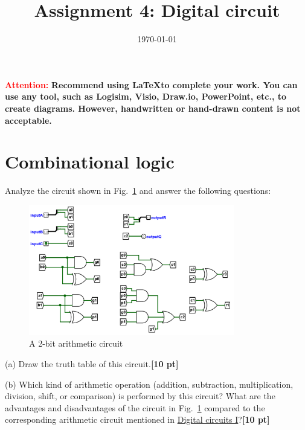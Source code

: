 \documentclass[a4paper]{article}
\date{\today}
\title{Assignment 4: Digital circuit}
\begin{document}
    \header{}
\textcolor{red}{\textbf{Attention: }}
\textbf{Recommend using \LaTeX to complete your work. You can use any tool, such as Logisim, Visio, Draw.io, PowerPoint, etc., to create diagrams. However, handwritten or hand-drawn content is not acceptable.}

\section{Combinational logic}
Analyze the circuit shown in Fig.~\ref{fig:circuit} and answer the following questions:
\begin{figure}[htbp]
    \centering
    \includegraphics[width=0.8\textwidth]{circuit.png}
    \caption{A 2-bit arithmetic circuit}
    \label{fig:circuit}
\end{figure}

(a) Draw the truth table of this circuit.\textbf{[10 pt]}

(b) Which kind of arithmetic operation (addition, subtraction, multiplication, division, shift, or comparison) is performed by this circuit? What are the advantages and disadvantages of the circuit in Fig.~\ref{fig:circuit} compared to the corresponding arithmetic circuit mentioned in \href{https://toast-lab.sist.shanghaitech.edu.cn/courses/CS110@ShanghaiTech/Spring-2024/lecture_notes/L09.\%20Digital\%20circuits\%20and\%20systems\%201.pdf}{Digital circuits I}?\textbf{[10 pt]}
\end{document}
